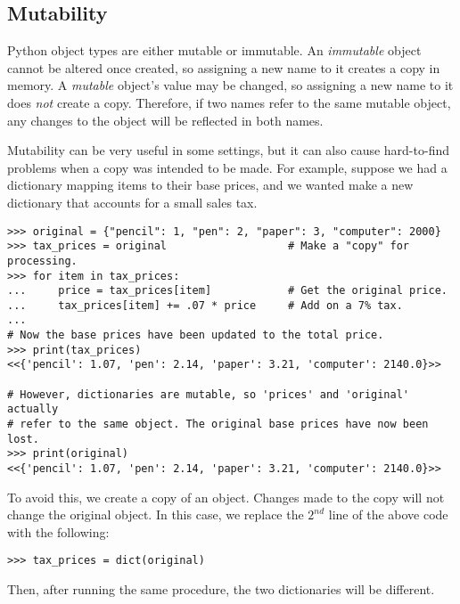 \subsection*{Mutability}

Python object types are either mutable or immutable.
An \emph{immutable} object cannot be altered once created, so assigning a new name to it creates a copy in memory.
A \emph{mutable} object's value may be changed, so assigning a new name to it does \emph{not} create a copy.
Therefore, if two names refer to the same mutable object, any changes to the object will be reflected in both names.

\begin{warn}
Mutability can be very useful in some settings, but it can also cause hard-to-find problems when a copy was intended to be made.
For example, suppose we had a dictionary mapping items to their base prices, and we wanted make a new dictionary that accounts for a small sales tax.

\begin{lstlisting}
>>> original = {"pencil": 1, "pen": 2, "paper": 3, "computer": 2000}
>>> tax_prices = original                   # Make a "copy" for processing.
>>> for item in tax_prices:
...     price = tax_prices[item]            # Get the original price.
...     tax_prices[item] += .07 * price     # Add on a 7% tax.
...
# Now the base prices have been updated to the total price.
>>> print(tax_prices)
<<{'pencil': 1.07, 'pen': 2.14, 'paper': 3.21, 'computer': 2140.0}>>

# However, dictionaries are mutable, so 'prices' and 'original' actually
# refer to the same object. The original base prices have now been lost.
>>> print(original)
<<{'pencil': 1.07, 'pen': 2.14, 'paper': 3.21, 'computer': 2140.0}>>
\end{lstlisting}

To avoid this, we create a copy of an object.
Changes made to the copy will not change the original object.
In this case, we replace the $2^{nd}$ line of the above code with the following:
\begin{lstlisting}
>>> tax_prices = dict(original)
\end{lstlisting}
Then, after running the same procedure, the two dictionaries will be different.
\end{warn}

